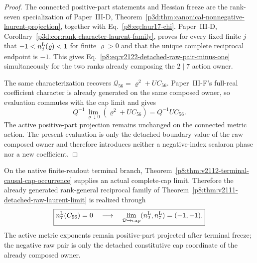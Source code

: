 \documentclass[12pt,a4paper]{article}
\begin{document}
\begin{proof}
The connected positive-part statements and Hessian freeze are the rank-seven
specialization of Paper~III-D,
Theorem~\ref{p3d:thm:canonical-nonnegative-laurent-projection}, together with
Eq.~\eqref{p8:eq:laur17-chi}.  Paper~III-D,
Corollary~\ref{p3d:cor:rank-character-laurent-family}, proves for every fixed
finite \(j\) that \(-1<n_j^{\rm L}(\varrho)<1\) for finite \(\varrho>0\) and
that the unique complete reciprocal endpoint is \(-1\).  This gives
Eq.~\eqref{p8:eq:v2122-detached-raw-pair-minus-one} simultaneously for the two
ranks already composing the \(2\mid7\) action owner.

The same characterization recovers
\(\mathscr Q_{56}=\varrho^2+UC_{56}\).  Paper~III-F's full-real coefficient
character is already generated on the same composed owner, so evaluation
commutes with the cap limit and gives
\[
 Q^{-1}\lim_{\varrho\downarrow0}
 (\varrho^2+UC_{56})=Q^{-1}UC_{56}.
\]
The active positive-part projection remains unchanged on the connected metric
action.  The present evaluation is only the detached boundary value of the raw
composed owner and therefore introduces neither a negative-index scalaron
phase nor a new coefficient.
\end{proof}

\begin{corollary}
\label{p8:cor:v2112-nzero-to-minusone-occurrence}
On the native finite-readout terminal branch,
Theorem~\ref{p8:thm:v2112-terminal-causal-cap-occurrence} supplies an actual
complete-cap limit.  Therefore the already generated rank-general reciprocal
family of Theorem~\ref{p8:thm:v2111-detached-raw-laurent-limit} is realized
through
\begin{equation}
\label{p8:eq:v2112-nzero-to-minusone}
 \boxed{
 n_7^{\rm L}(C_{56})=0
 \quad\longrightarrow\quad
 \lim_{\mathcal D\to{\rm cap}}
 (n_2^{\rm L},n_7^{\rm L})=(-1,-1).}
\end{equation}
The active metric exponents remain positive-part projected after terminal
freeze; the negative raw pair is only the detached constitutive cap coordinate
of the already composed owner.
\end{corollary}
\end{document}
